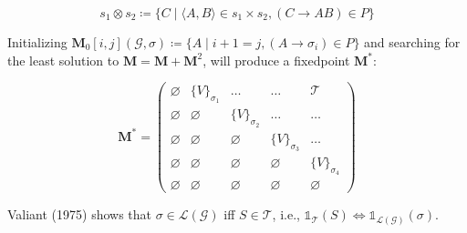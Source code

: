 \documentclass[portrait,a0b,final,a4resizeable]{a0poster}
\def\jointspacing{\vspace{0.3in}}
\begin{document}
\begin{poster}
\begin{multicols}{2}
      \[
        s_1 \otimes s_2 \coloneqq \{C \mid \langle A, B\rangle \in s_1 \times s_2, (C\rightarrow AB) \in P\}
      \]

      \null\hspace*{3cm}\begin{minipage}[c]{0.85\columnwidth}
          Initializing $\mathbf{M}_0[i, j](\mathcal{G}, \sigma) \coloneqq \{A \mid i + 1 = j, (A \rightarrow \sigma_i) \in P\}$ and searching for the least solution to $\mathbf{M} = \mathbf{M} + \mathbf{M}^2$, will produce a fixedpoint $\mathbf{M}^*$:\\
      \end{minipage}

      \[
        \mathbf{M}^* = \begin{pmatrix}
                         \varnothing & \{V\}_{\sigma_1} & \ldots & \ldots & \mathcal{T} \\
                         \varnothing & \varnothing & \{V\}_{\sigma_2} & \ldots & \ldots \\
                         \varnothing & \varnothing & \varnothing & \{V\}_{\sigma_3} & \ldots \\
                         \varnothing & \varnothing & \varnothing & \varnothing & \{V\}_{\sigma_4} \\
                         \varnothing & \varnothing & \varnothing & \varnothing & \varnothing
        \end{pmatrix}
      \]

      \null\hspace*{3cm}\begin{minipage}[c]{0.85\columnwidth}
          Valiant (1975) shows that $\sigma \in \mathcal{L}(\mathcal{G})$ iff $S \in \mathcal{T}$, i.e., $\mathds{1}_{\mathcal{T}}(S) \iff \mathds{1}_{\mathcal{L}(\mathcal{G})}(\sigma)$.
      \end{minipage}

      \jointspacing


\end{multicols}
\end{poster}
\end{document}
